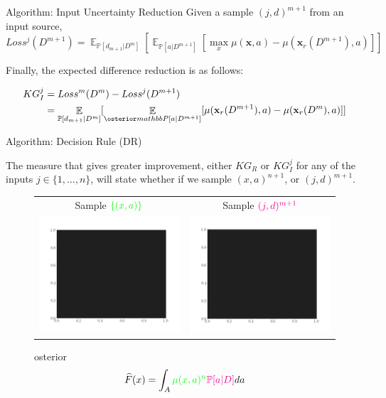 \documentclass{beamer}
\DeclareMathOperator{\EX}{\mathbb{E}}%
\begin{document}
\begin{frame}{Algorithm: Input Uncertainty Reduction}
Given a sample $(j,d)^{m+1}$ from an input source,
\begin{equation*}
Loss^{j}(D^{m+1}) = \EX_{\mathbb{P}[d_{m+1}|D^{m}]}[ \EX_{\mathbb{P}[a|D^{m+1}]}[\max_{x}\mu(\mathbf{x},a) - \mu(\mathbf{x}_{r}(D^{m+1}),a)]]
\end{equation*}

Finally, the expected difference reduction is as follows:


\begin{align*}
\begin{split}
KG_{I}^{j} &= Loss^{m}(D^{m}) - Loss^{j}(D^{m+1})\\
&=\EX_{\mathbb{P}[d_{m+1}|D^{m}]}[\EX_{\osterior mathbb{P}[a|D^{m+1}]}[ \mu(\mathbf{x}_{r}(D^{m+1}),a)- \mu(\mathbf{x}_{r}(D^{m}),a)]]
\end{split}
\end{align*}
\end{frame}

\begin{frame}{Algorithm: Decision Rule (DR)}



The measure that gives greater improvement, either $KG_{R}$ or $KG^{j}_{I}$
for any of the inputs $j \in \{1,\dots,n\}$, will state whether if we sample
$(x,a)^{n+1}$, or $(j, d)^{m+1}$.

\begin{figure}
	\centering
	\begin{tabular}{cc}
		Sample $\textcolor{green}{\{(x,a)\}}$ & Sample $\textcolor{magenta}{(j, d)^{m+1}}$\\
		\includegraphics[width=5.5cm]{FILLING.png}&
		\includegraphics[width=5.5cm]{FILLING.png}\\
	\end{tabular}
	osterior 
	$$ \widehat{F}(x) = \int_{A} \textcolor{green}{\mu (x,a)^{n}} \textcolor{magenta}{\mathbb{P}[a|D]}da$$
\end{figure}


\end{frame}
\end{document}
